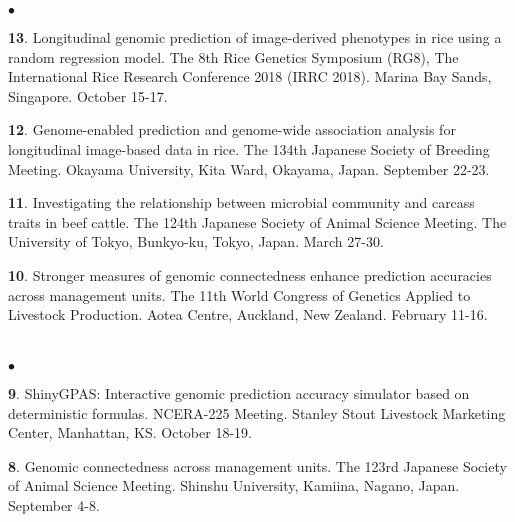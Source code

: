 \documentclass[margin,line,10pt]{res}
\newenvironment{list2}{
  \begin{list}{$\bullet$}{%
      \setlength{\itemsep}{0in}
      \setlength{\parsep}{0in} \setlength{\parskip}{0in}
      \setlength{\topsep}{0in} \setlength{\partopsep}{0in} 
      \setlength{\leftmargin}{0.2in}}}{\end{list}}
\begin{document}
\begin{resume}
\begin{list2}
  \vspace{0.5cm}

\item [{\bf 13}.] Longitudinal genomic prediction of image-derived phenotypes in rice using a random regression model. The 8th Rice Genetics Symposium (RG8), The International Rice Research Conference 2018 (IRRC 2018). Marina Bay Sands, Singapore. October 15-17.
  
  \vspace{0.5cm}
  
\item [{\bf 12}.] Genome-enabled prediction and genome-wide association analysis for longitudinal image-based data in rice. The 134th Japanese Society of Breeding Meeting. Okayama University, Kita Ward, Okayama, Japan. September 22-23.
  
  \vspace{0.5cm}

  
  \item [{\bf 11}.] Investigating the relationship between microbial community and carcass traits in beef cattle.  The 124th Japanese Society of Animal Science Meeting. The University of Tokyo, Bunkyo-ku, Tokyo, Japan. March 27-30.

    
    \vspace{0.5cm}

          
\item [{\bf 10}.] Stronger measures of genomic connectedness enhance prediction accuracies across management units. The 11th World Congress of Genetics Applied to Livestock Production.  Aotea Centre, Auckland, New Zealand. February 11-16. 

\end{list2}  





\section{}
\begin{list2}

  \item [{\bf 9}.] ShinyGPAS: Interactive genomic prediction accuracy simulator based on deterministic formulas. NCERA-225 Meeting. Stanley Stout Livestock Marketing Center, Manhattan, KS. October 18-19. 

      \vspace{0.5cm}

  \item [{\bf 8}.] Genomic connectedness across management units. The 123rd Japanese Society of Animal Science Meeting. Shinshu University, Kamiina, Nagano, Japan. September 4-8.


\end{list2}
\end{resume}
\end{document}
